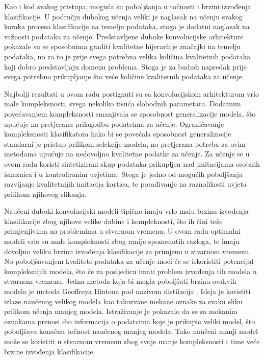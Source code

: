 \documentclass[lmodern, utf8, diplomski, numeric]{fer}
\begin{document}
Kao i kod svakog pristupa, moguća su poboljšanja u točnosti i brzini izvođenja klasifikacije. U području dubokog učenja veliki je naglasak na učenju svakog koraka procesa klasifikacije na temelju podataka, stoga je dodatni naglasak na važnosti podataka za učenje. Predstavljene duboke konvolucijske arhitekture pokazale su se sposobnima graditi kvalitetne hijerarhije značajki na temelju podataka, no za to je prije svega potrebna velika količina kvalitetnih podataka koji dobro predstavljaju domenu problema. Stoga je za budući napredak prije svega potrebno prikupljanje što veće količine kvalitetnih podataka za učenje. 

Najbolji rezultati u ovom radu postignuti su sa konvolucijskom arhitekturom vrlo male kompleksnosti, svega nekoliko tisuća slobodnih parametara. Dodatnim povećavanjem kompleksnosti smanjivala se sposobnost generalizacije modela, što upućuje na pretjeranu prilagodbu podatcima za učenje. Ograničavanje kompleksnosti klasifikatora kako bi se povećala sposobnost generalizacije standarni je pristup prilikom selekcije modela, no pretjerana potreba za ovim metodama upućuje na nedovoljno kvalitetne podatke za učenje. Za učenje se u ovom radu koristi sintetizirani skup podataka prikupljen nad imitacijama osobnih iskaznica i u kontroliranim uvjetima. Stoga je jedno od mogućih poboljšanja razvijanje kvalitetnijih imitacija kartica, te porađivanje na raznolikosti uvjeta prilikom njihovog slikanja.

Naučeni duboki konvolucijski modeli tipično imaju vrlo malu brzinu izvođenja klasifikacije zbog njihove velike dubine i kompleknosti, što ih čini teže primjenjivima na problemima u stvarnom vremenu. U ovom radu optimalni modeli vrlo su male kompleknosti zbog ranije spomenutih razloga, te imaju dovoljno veliku brzinu izvođenja klasifikacije za primjenu u stvarnom vremenu. No poboljšavanjem kvalitete podataka za učenje moći će se iskoristiti potencijal kompleksnijih modela, što će za posljedicu imati problem izvođenja tih modela u stvarnom vremenu. Jedna metoda koja bi mogla poboljšati brzinu ovakvih modela je metoda Geoffreya Hintona pod nazivom distilacija \cite{hinton2015distill}. Ideja je koristiti izlaze naučenog velikog modela kao takozvane mekane oznake za svaku sliku prilikom učenja manjeg modela. Istraživanje je pokazalo da se sa mekanim oznakama prenosi dio informacija o podatcima koje je prikupio veliki model, što poboljšava konačnu točnost naučenog manjeg modela. Tako naučeni manji model može se koristiti u stvarnom vremenu zbog svoje manje kompleksnosti i time veće brzine izvođenja klasifikacije.   
\end{document}
